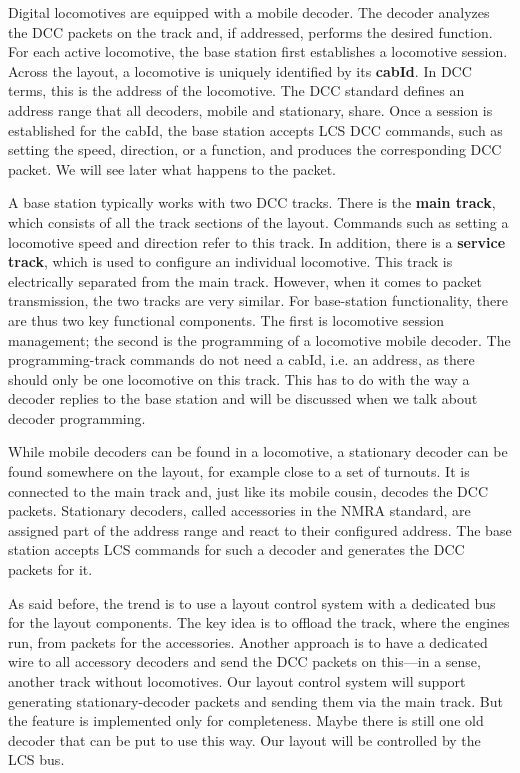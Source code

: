 
Digital locomotives are equipped with a mobile decoder. The decoder analyzes the DCC packets on the track and, if addressed, performs the desired function. For each active locomotive, the base station first establishes a locomotive session. Across the layout, a locomotive is uniquely identified by its \textbf{cabId}. In DCC terms, this is the address of the locomotive. The DCC standard defines an address range that all decoders, mobile and stationary, share. Once a session is established for the cabId, the base station accepts LCS DCC commands, such as setting the speed, direction, or a function, and produces the corresponding DCC packet. We will see later what happens to the packet.

A base station typically works with two DCC tracks. There is the \textbf{main track}, which consists of all the track sections of the layout. Commands such as setting a locomotive speed and direction refer to this track. In addition, there is a \textbf{service track}, which is used to configure an individual locomotive. This track is electrically separated from the main track. However, when it comes to packet transmission, the two tracks are very similar. For base-station functionality, there are thus two key functional components. The first is locomotive session management; the second is the programming of a locomotive mobile decoder. The programming-track commands do not need a cabId, i.e. an address, as there should only be one locomotive on this track. This has to do with the way a decoder replies to the base station and will be discussed when we talk about decoder programming.


While mobile decoders can be found in a locomotive, a stationary decoder can be found somewhere on the layout, for example close to a set of turnouts. It is connected to the main track and, just like its mobile cousin, decodes the DCC packets. Stationary decoders, called accessories in the NMRA standard, are assigned part of the address range and react to their configured address. The base station accepts LCS commands for such a decoder and generates the DCC packets for it.

As said before, the trend is to use a layout control system with a dedicated bus for the layout components. The key idea is to offload the track, where the engines run, from packets for the accessories. Another approach is to have a dedicated wire to all accessory decoders and send the DCC packets on this---in a sense, another track without locomotives. Our layout control system will support generating stationary-decoder packets and sending them via the main track. But the feature is implemented only for completeness. Maybe there is still one old decoder that can be put to use this way. Our layout will be controlled by the LCS bus.


